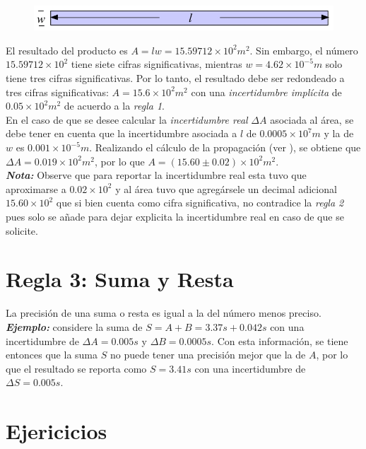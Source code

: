 \documentclass{replab}
\begin{document}
	\begin{figure}[htbp]
		\centering
		\includegraphics[width=.6\columnwidth]{imagenes/tirilla.jpeg}
	\end{figure}

	El resultado del producto es $A=lw=15.59712\times 10^2 m^2$. Sin embargo, el número $15.59712\times 10^2$ tiene siete cifras significativas, mientras $w=4.62\times 10^{-5}m$ solo tiene tres cifras significativas. Por lo tanto, el resultado debe ser redondeado a tres cifras significativas: $A=15.6\times 10^2 m^2$ con una \textit{incertidumbre implícita} de $0.05\times 10^2 m^2$ de acuerdo a la \textit{regla 1}.\\

	En el caso de que se desee calcular la \textit{incertidumbre real} $\Delta A$ asociada al área, se debe tener en cuenta que la incertidumbre asociada a $l$ de $0.0005\times 10^7m$ y la de $w$ es $0.001\times 10^{-5}m$. Realizando el cálculo de la propagación (ver \cite{lanaturaleza}), se obtiene que $\Delta A= 0.019\times 10^2 m^2$, por lo que $A=(15.60 \pm 0.02)\times 10^2 m^2$. \\
	
	\textit{\textbf{Nota:}} Observe que para reportar la incertidumbre real esta tuvo que aproximarse a $0.02\times 10^2$ y al área tuvo que agregársele un decimal adicional $15.60\times 10^2$ que si bien cuenta como cifra significativa, no contradice la \textit{regla 2} pues solo se añade para dejar explicita la incertidumbre real en caso de que se solicite. \medskip 

	\section{Regla 3: Suma y Resta}

	La precisión de una suma o resta es igual a la del número menos preciso. \textit{\textbf{Ejemplo:}} considere la suma de $S = A + B = 3.37s + 0.042s$ con una incertidumbre de $\Delta A = 0.005s$ y $\Delta B = 0.0005s$. Con esta información, se tiene entonces que la suma $S$ no puede tener una precisión mejor que la de $A$, por lo que el resultado se reporta como $S = 3.41s$ con una incertidumbre de $\Delta S =0.005s$.  

	\section{Ejericicios}
\end{document}
